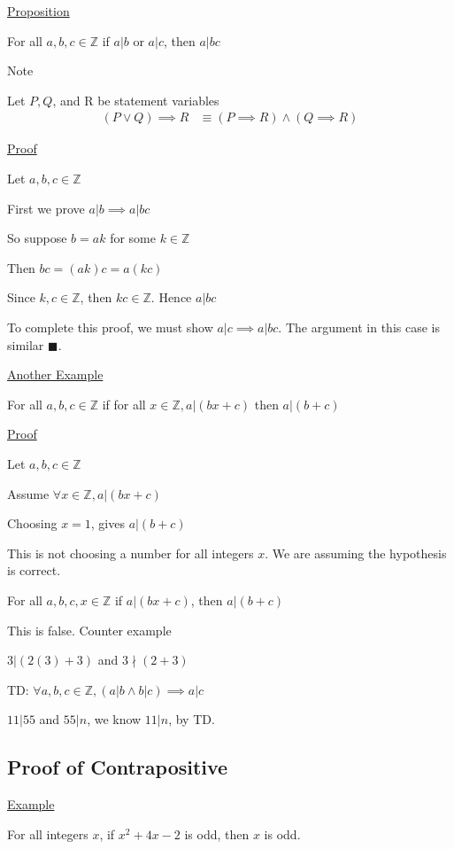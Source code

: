 \documentclass{article}
\begin{document}
\underline{Proposition}

For all $a,b,c \in \mathbb{Z}$ if $a \vert b$ or $a \vert c$, then $a \vert bc$

Note 

Let $P,Q$, and R be statement variables
\begin{align*}
    (P \vee Q) \implies R &\equiv (P \implies R) \wedge (Q \implies R)
\end{align*}

\underline{Proof}

Let $a,b,c \in \mathbb{Z}$

First we prove $a \vert b \implies a \vert bc$

So suppose $b = ak$ for some $k \in \mathbb{Z}$

Then $bc = (ak)c = a(kc)$

Since $k,c \in \mathbb{Z}$, then $kc \in \mathbb{Z}$. Hence $a \vert bc$

To complete this proof, we must show $a \vert c \implies a \vert bc$. The argument in this case is similar $\blacksquare$.

\underline{Another Example}

For all $a,b,c \in \mathbb{Z}$ if for all $x \in \mathbb{Z}, a \vert (bx + c)$ then $a \vert (b + c)$

\underline{Proof}

Let $a,b,c \in \mathbb{Z}$

Assume $\forall x \in \mathbb{Z}, a \vert (bx + c)$

Choosing $x=1$, gives $a \vert (b + c)$

This is not choosing a number for all integers $x$. We are assuming the hypothesis is correct.

For all $a,b,c,x \in \mathbb{Z}$ if $a \vert (bx + c)$, then $a \vert (b + c)$

This is false. Counter example

$3 \vert (2(3) + 3)$ and $3 \nmid (2 + 3)$

TD: $\forall a,b,c \in \mathbb{Z}, (a \vert b \wedge b \vert c) \implies a \vert c$

$11 \vert 55$ and $55 \vert n$, we know $11 \vert n$, by TD.


\subsection{Proof of Contrapositive}

\underline{Example}

For all integers $x$, if $x^2 + 4x-2$ is odd, then $x$ is odd. 
\end{document}
